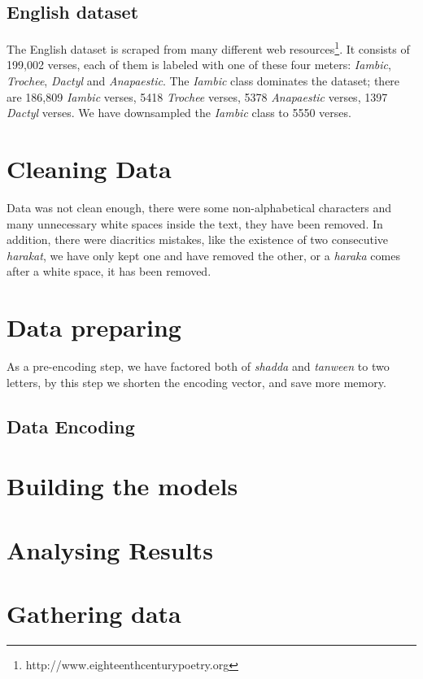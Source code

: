 \documentclass[12pt]{article}
\begin{document}
\subsection{English dataset}
The English dataset is scraped from many different web
resources\footnote{http://www.eighteenthcenturypoetry.org}. It consists of 199,002
verses, each of them is labeled with one of these four meters: \textit{Iambic},
\textit{Trochee}, \textit{Dactyl} and \textit{Anapaestic}.  The \textit{Iambic}
class dominates the dataset; there are  186,809 \textit{Iambic} verses, 5418
\textit{Trochee} verses, 5378  \textit{Anapaestic} verses, 1397 \textit{Dactyl}
verses.  We have downsampled the \textit{Iambic} class to 5550 verses.



\section{Cleaning Data}
Data was not clean enough, there were some non-alphabetical characters and many
unnecessary white spaces inside the text, they have been removed.  In addition,
there were diacritics mistakes, like the existence of two consecutive
\textit{harakat}, we have only kept one and have removed the other, or a
\textit{haraka} comes after a white space, it has been removed. 

\section{Data preparing}
As a pre-encoding step, we have factored both of \textit{shadda} and
\textit{tanween} to two letters,  by this step we shorten the encoding vector,
and save more memory.







\subsection{Data Encoding}
\section{Building the models}


\section{Analysing Results}






\section{Gathering data}

\end{document}
